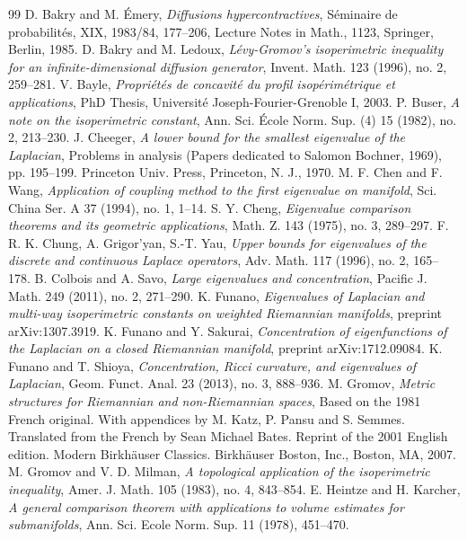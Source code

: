 \documentclass[12pt]{amsart}
\theoremstyle{plain}
\theoremstyle{definition}
\theoremstyle{remark}
\begin{document}
\begin{thebibliography}{99}
  D. Bakry and M. \'Emery, \textit{Diffusions hypercontractives}, S\'eminaire de probabilit\'es, XIX, 1983/84, 177--206, Lecture Notes in Math., 1123, Springer, Berlin, 1985.
  D. Bakry and M. Ledoux, \textit{L\'evy-Gromov's isoperimetric inequality for an infinite-dimensional diffusion generator}, Invent. Math. 123 (1996), no. 2, 259--281.
    V. Bayle, \textit{Propri\'et\'es de concavit\'e du profil isop\'erim\'etrique et applications}, PhD Thesis, Universit\'e Joseph-Fourier-Grenoble I, 2003.
  P. Buser, \textit{A note on the isoperimetric constant}, Ann. Sci. \'Ecole Norm. Sup. (4) 15 (1982), no. 2, 213--230.
  J. Cheeger, \textit{A lower bound for the smallest eigenvalue of the Laplacian}, Problems in analysis (Papers dedicated to Salomon Bochner, 1969), pp. 195--199. Princeton Univ. Press, Princeton, N. J., 1970.
 M. F. Chen and F. Wang, \textit{Application of coupling method to the first eigenvalue on manifold}, Sci. China Ser. A 37 (1994), no. 1, 1--14.
 S. Y. Cheng, \textit{Eigenvalue comparison theorems and its geometric applications}, Math. Z. 143 (1975), no. 3, 289--297.
 F. R. K. Chung, A. Grigor'yan, S.-T. Yau, \textit{Upper bounds for eigenvalues of the discrete and continuous Laplace operators}, Adv. Math. 117 (1996), no. 2, 165--178.
   B. Colbois and A. Savo, \textit{Large eigenvalues and concentration}, Pacific J. Math. 249 (2011), no. 2, 271--290.
   K. Funano, \textit{Eigenvalues of Laplacian and multi-way isoperimetric constants on weighted Riemannian manifolds}, preprint arXiv:1307.3919.
   K. Funano and Y. Sakurai, \textit{Concentration of eigenfunctions of the Laplacian on a closed Riemannian manifold}, preprint arXiv:1712.09084.
   K. Funano and T. Shioya, \textit{Concentration, Ricci curvature, and eigenvalues of Laplacian}, Geom. Funct. Anal. 23 (2013), no. 3, 888--936.
    M. Gromov, \textit{Metric structures for Riemannian and non-Riemannian spaces}, Based on the 1981 French original.
                      With appendices by M. Katz, P. Pansu and S. Semmes. Translated from the French by Sean Michael Bates. Reprint of the 2001 English edition.
                      Modern Birkh\"auser Classics. Birkh\"auser Boston, Inc., Boston, MA, 2007.
 M. Gromov and V. D. Milman, \textit{A topological application of the isoperimetric inequality}, Amer. J. Math. 105 (1983), no. 4, 843--854.
  E. Heintze and H. Karcher, \textit{A general comparison theorem with applications to volume estimates for submanifolds}, Ann. Sci. Ecole Norm. Sup. 11 (1978), 451--470.

\end{thebibliography}
\end{document}
